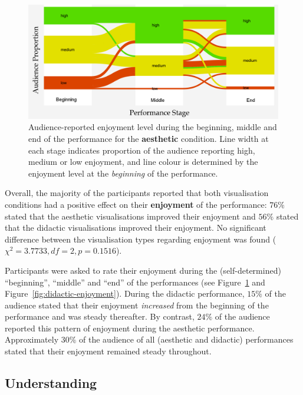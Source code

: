 \begin{figure}
  \centering 
  \includegraphics[width=\columnwidth]{../study-2/results/graphs/aesthetic-enjoyment-final}
  \caption{Audience-reported enjoyment level during the beginning,
    middle and end of the performance for the \textbf{aesthetic} condition.
    Line width at each stage indicates proportion of the audience
    reporting high, medium or low enjoyment, and line colour is
    determined by the enjoyment level at the \emph{beginning} of the
    performance.}
\label{fig:aesthetic-enjoyment}
\end{figure}

Overall, the majority of the participants reported that both
visualisation conditions had a positive effect on their
\textbf{enjoyment} of the performance: $76\%$ stated that the
aesthetic visualisations improved their enjoyment and $56\%$ stated
that the didactic visualisations improved their enjoyment. No
significant difference between the visualisation types regarding 
enjoyment was found ($\chi^2=3.7733,df=2,p=0.1516$).

Participants were asked to rate their enjoyment during the
(self-determined) ``beginning'', ``middle'' and ``end'' of the
performances (see Figure~\ref{fig:aesthetic-enjoyment} and
Figure~\ref{fig:didactic-enjoyment}). During the didactic
performance, $15\%$ of the audience stated that their enjoyment
\emph{increased} from the beginning of the performance and was
steady thereafter. By contrast, $24\%$ of the audience
reported this pattern of enjoyment during the aesthetic
performance. Approximately $30\%$ of the audience of all
(aesthetic and didactic) performances stated that their
enjoyment remained steady throughout.

\subsection{Understanding}

